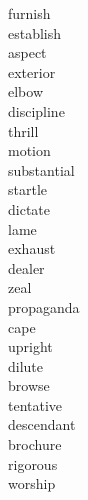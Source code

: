 \documentclass[b5paper, 11pt]{ctexart}
\begin{document}
\clearpage

\begin{multicols*}{3}
    \begin{description}

\item[furnish]

\item[establish]

\item[aspect]

\item[exterior]

\item[elbow]

\item[discipline]

\item[thrill]

\item[motion]

\item[substantial]

\item[startle]

\item[dictate]

\item[lame]

\item[exhaust]

\item[dealer]

\item[zeal]

\item[propaganda]

\item[cape]

\item[upright]

\item[dilute]

\item[browse]

\item[tentative]

\item[descendant]

\item[brochure]

\item[rigorous]

\item[worship]


\end{description}
\end{multicols*}
\end{document}
